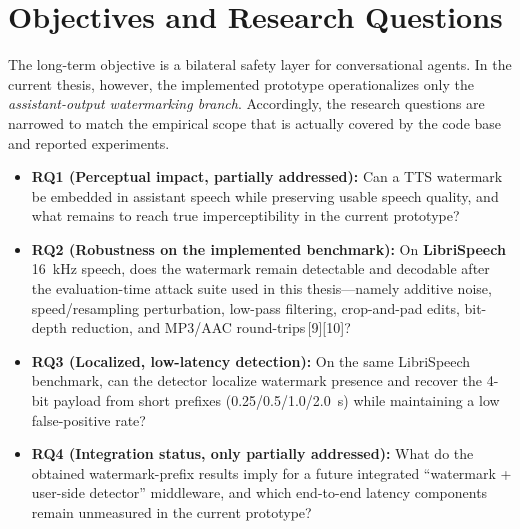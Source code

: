 \section{Objectives and Research Questions}
The long-term objective is a bilateral safety layer for conversational agents. In the current thesis, however, the implemented prototype operationalizes only the \emph{assistant-output watermarking branch}. Accordingly, the research questions are narrowed to match the empirical scope that is actually covered by the code base and reported experiments.

\begin{itemize}[leftmargin=1.25em]
  \item \textbf{RQ1 (Perceptual impact, partially addressed):} Can a TTS watermark be embedded in assistant speech while preserving usable speech quality, and what remains to reach true imperceptibility in the current prototype?
  \item \textbf{RQ2 (Robustness on the implemented benchmark):} On \textbf{LibriSpeech} 16~kHz speech, does the watermark remain detectable and decodable after the evaluation-time attack suite used in this thesis---namely additive noise, speed/resampling perturbation, low-pass filtering, crop-and-pad edits, bit-depth reduction, and MP3/AAC round-trips\,[9][10]?
  \item \textbf{RQ3 (Localized, low-latency detection):} On the same LibriSpeech benchmark, can the detector localize watermark presence and recover the 4-bit payload from short prefixes (0.25/0.5/1.0/2.0~s) while maintaining a low false-positive rate?
  \item \textbf{RQ4 (Integration status, only partially addressed):} What do the obtained watermark-prefix results imply for a future integrated ``watermark + user-side detector'' middleware, and which end-to-end latency components remain unmeasured in the current prototype?
\end{itemize}


